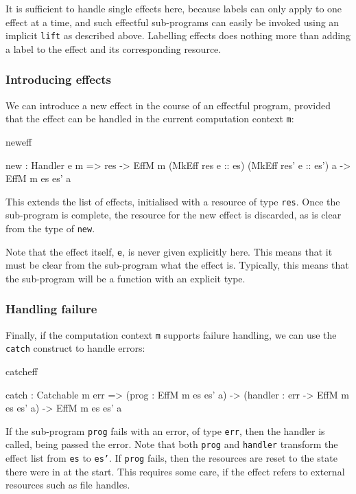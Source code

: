 \noindent
It is sufficient to handle single effects here, because labels can only
apply to one effect at a time, and such effectful sub-programs can easily
be invoked using an implicit \texttt{lift} as described above. Labelling
effects does nothing more than adding a label to the effect and its corresponding
resource.

\subsubsection{Introducing effects}

We can introduce a new effect in the course of an effectful program, provided
that the effect can be handled in the current computation context \texttt{m}:

\begin{SaveVerbatim}{neweff}

new : Handler e m => 
      res -> EffM m (MkEff res e :: es) 
                    (MkEff res' e :: es') a ->
      EffM m es es' a

\end{SaveVerbatim}

\noindent
This extends the list of effects, initialised with
a resource of type \texttt{res}.
Once the sub-program is complete, the resource for the new effect is discarded,
as is clear from the type of \texttt{new}.

Note that the effect itself, \texttt{e}, is never given explicitly here. This
means that it must be clear from the sub-program what the effect is. Typically,
this means that the sub-program will be a function with an explicit type.

\subsubsection{Handling failure}

Finally, if the computation context \texttt{m} supports failure handling,
we can use the \texttt{catch} construct to handle errors:

\begin{SaveVerbatim}{catcheff}

catch : Catchable m err =>
        (prog : EffM m es es' a) -> 
        (handler : err -> EffM m es es' a) ->
        EffM m es es' a

\end{SaveVerbatim}

\noindent
If the sub-program \texttt{prog} fails with an error, of type \texttt{err}, then
the handler is called, being passed the error. Note that both \texttt{prog}
and \texttt{handler} transform the effect list from \texttt{es} to \texttt{es'}.
If \texttt{prog} fails, then the resources are reset to the state there were in
at the start. This requires some care, if the effect refers to external
resources such as file handles.

